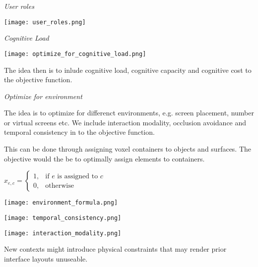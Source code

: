 \textit{User roles}

\begin{center}
	\texttt{[image: user\_roles.png]}
\end{center}

\textit{Cognitive Load}

\begin{center}
	\texttt{[image: optimize\_for\_cognitive\_load.png]}
\end{center}


The idea then is to inlude cognitive load, cognitive capacity and cognitive cost to the objective function. \medskip

\textit{Optimize for environment} \smallskip

The idea is to optimize for differenct environments, e.g. screen placement, number or virtual screens etc. 
We include interaction modality, occlusion avoidance and temporal consistency in to the objective function. \smallskip

This can be done through assigning voxel containers to objects and surfaces. The objective would the be to optimally assign elements to containers. 

$x_{e,c} = \begin{cases} 1, & \text{if } e \text{ is assigned to } c \\ 0, & \text{otherwise} \end{cases}$

\begin{center}
	\texttt{[image: environment\_formula.png]}
\end{center}

\begin{center}
	\texttt{[image: temporal\_consistency.png]}
\end{center}


\begin{center}
	\texttt{[image: interaction\_modality.png]}
\end{center}

New contexts might introduce physical constraints that may render prior interface layouts unuseable. 







